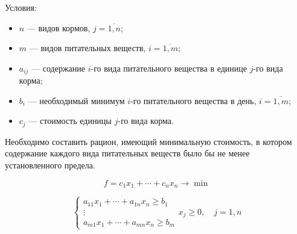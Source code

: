 \documentclass[17pt]{extarticle}
\begin{document}
\begin{definition}
    Условия:
    \begin{itemize}
        \item \( n \) — видов кормов, \( j =\overline{1, n} \);
        \item \( m \) — видов питательных веществ, \( i =\overline{1, m} \);
        \item \( a_{ij} \) — содержание \( i \)-го вида питательного вещества в единице \( j \)-го вида корма;
        \item \( b_i \) — необходимый минимум \( i \)-го питательного вещества в день, \( i=\overline{1,m} \);
        \item \( c_j \) — стоимость единицы \( j \)-го вида корма.
    \end{itemize}

    Необходимо составить рацион, имеющий минимальную стоимость, в котором содержание каждого вида питательных веществ было бы не менее установленного предела.

    \[
        f = c_1 x_1 + \cdots + c_n x_n \rightarrow \min
    \]

    \[
        \begin{cases}
            a_{11} x_1 + \cdots + a_{1n} x_n \geq b_1 \\
            \vdots                                    \\
            a_{m1} x_1 + \cdots + a_{mn} x_n \geq b_m
        \end{cases} x_j \geq 0, \quad j = 1, n
    \]
\end{definition}
\end{document}
